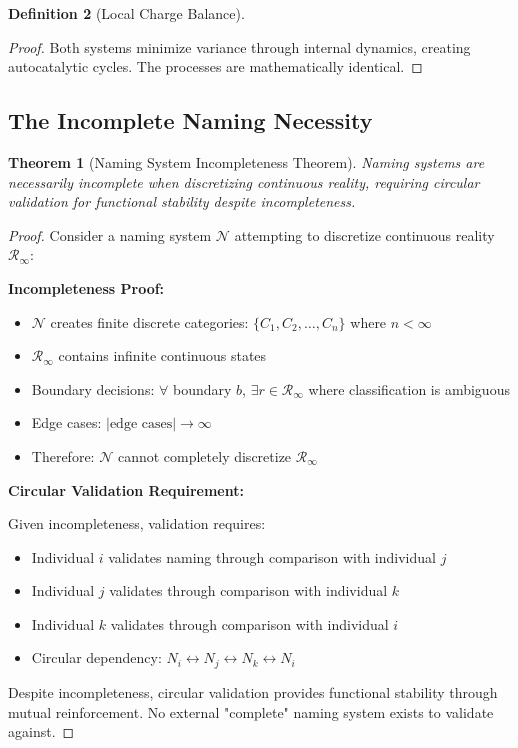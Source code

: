 \documentclass[12pt,a4paper]{article}
\theoremstyle{plain}
\newtheorem{theorem}{Theorem}[section]
\theoremstyle{definition}
\newtheorem{definition}[theorem]{Definition}
\theoremstyle{remark}
\begin{document}
\begin{definition}[Local Charge Balance]
\begin{proof}
Both systems minimize variance through internal dynamics, creating autocatalytic cycles. The processes are mathematically identical.
\end{proof}

\subsection{The Incomplete Naming Necessity}

\begin{theorem}[Naming System Incompleteness Theorem]
Naming systems are necessarily incomplete when discretizing continuous reality, requiring circular validation for functional stability despite incompleteness.
\end{theorem}

\begin{proof}
Consider a naming system $\mathcal{N}$ attempting to discretize continuous reality $\mathcal{R}_{\infty}$:

\textbf{Incompleteness Proof:}
\begin{itemize}
\item $\mathcal{N}$ creates finite discrete categories: $\{C_1, C_2, \ldots, C_n\}$ where $n < \infty$
\item $\mathcal{R}_{\infty}$ contains infinite continuous states
\item Boundary decisions: $\forall$ boundary $b$, $\exists r \in \mathcal{R}_{\infty}$ where classification is ambiguous
\item Edge cases: $|\text{edge cases}| \rightarrow \infty$
\item Therefore: $\mathcal{N}$ cannot completely discretize $\mathcal{R}_{\infty}$
\end{itemize}

\textbf{Circular Validation Requirement:}

Given incompleteness, validation requires:
\begin{itemize}
\item Individual $i$ validates naming through comparison with individual $j$
\item Individual $j$ validates through comparison with individual $k$
\item Individual $k$ validates through comparison with individual $i$
\item Circular dependency: $N_i \leftrightarrow N_j \leftrightarrow N_k \leftrightarrow N_i$
\end{itemize}

Despite incompleteness, circular validation provides functional stability through mutual reinforcement. No external "complete" naming system exists to validate against.


\end{proof}
\end{definition}
\end{document}

